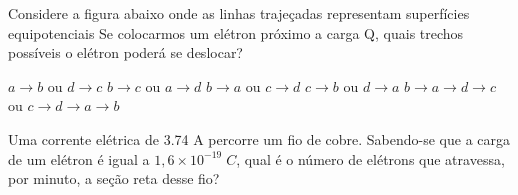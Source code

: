 \documentclass[12pt, addpoints]{exam}
\begin{document}
    \begin{questions}
\begin{multicols*}{2}
\question Considere a figura abaixo onde as linhas trajeçadas representam superfícies equipotenciais Se colocarmos um elétron próximo a carga Q, quais trechos possíveis o elétron poderá se deslocar?
        
        \begin{center}
            \begin{minipage}[c]{0.5\linewidth}
            \end{minipage}
        \end{center}
        
        

\begin{choices}
\choice $a\rightarrow b$ ou $d\rightarrow c$ 
\choice $b\rightarrow c$ ou $a\rightarrow d$ 
\choice $b\rightarrow a$ ou $c\rightarrow d$ 
\choice $c\rightarrow b$ ou $d\rightarrow a$ 
\choice $b\rightarrow a\rightarrow d\rightarrow c$ ou $c\rightarrow d\rightarrow a\rightarrow b$ 
\end{choices}
\question Uma corrente elétrica de    3.74 A percorre um ﬁo de cobre. Sabendo-se que a carga de um elétron é igual a $1,6\times 10^{-19}\;C$, qual é o número de elétrons que atravessa, por minuto, a seção reta desse ﬁo?


\end{multicols*}
\end{questions}
\end{document}
